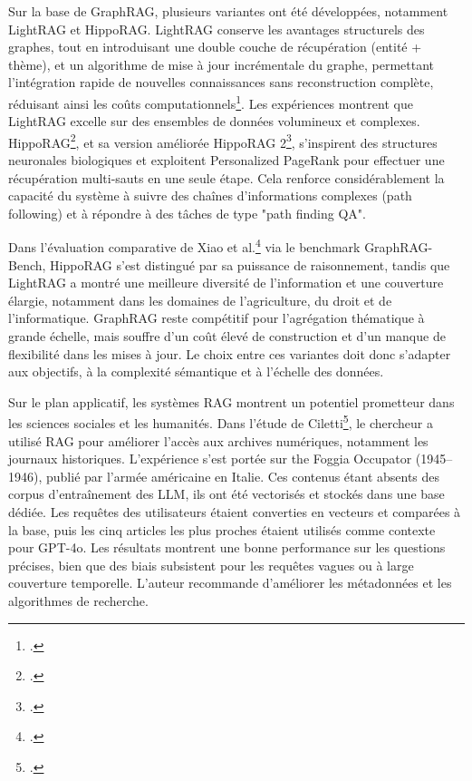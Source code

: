 \documentclass[a4paper,twoside,12pt]{book}
\begin{document}
Sur la base de GraphRAG, plusieurs variantes ont été développées, notamment LightRAG et HippoRAG. LightRAG conserve les avantages structurels des graphes, tout en introduisant une double couche de récupération (entité + thème), et un algorithme de mise à jour incrémentale du graphe, permettant l'intégration rapide de nouvelles connaissances sans reconstruction complète, réduisant ainsi les coûts computationnels\footcite{guo2024}. Les expériences montrent que LightRAG excelle sur des ensembles de données volumineux et complexes. HippoRAG\footcite{gutierrez2025d}, et sa version améliorée HippoRAG 2\footcite{gutierrez2025c}, s'inspirent des structures neuronales biologiques et exploitent Personalized PageRank pour effectuer une récupération multi-sauts en une seule étape. Cela renforce considérablement la capacité du système à suivre des chaînes d'informations complexes (path following) et à répondre à des tâches de type "path finding QA".

Dans l'évaluation comparative de Xiao et al.\footcite{xiao2025} via le benchmark GraphRAG-Bench, HippoRAG s'est distingué par sa puissance de raisonnement, tandis que LightRAG a montré une meilleure diversité de l'information et une couverture élargie, notamment dans les domaines de l'agriculture, du droit et de l'informatique. GraphRAG reste compétitif pour l'agrégation thématique à grande échelle, mais souffre d'un coût élevé de construction et d'un manque de flexibilité dans les mises à jour. Le choix entre ces variantes doit donc s'adapter aux objectifs, à la complexité sémantique et à l'échelle des données.

Sur le plan applicatif, les systèmes RAG montrent un potentiel prometteur dans les sciences sociales et les humanités. Dans l'étude de Ciletti\footcite{ciletti}, le chercheur a utilisé RAG pour améliorer l'accès aux archives numériques, notamment les journaux historiques. L'expérience s'est portée sur the Foggia Occupator (1945–1946), publié par l'armée américaine en Italie. Ces contenus étant absents des corpus d'entraînement des LLM, ils ont été vectorisés et stockés dans une base dédiée. Les requêtes des utilisateurs étaient converties en vecteurs et comparées à la base, puis les cinq articles les plus proches étaient utilisés comme contexte pour GPT-4o. Les résultats montrent une bonne performance sur les questions précises, bien que des biais subsistent pour les requêtes vagues ou à large couverture temporelle. L'auteur recommande d'améliorer les métadonnées et les algorithmes de recherche.
\end{document}
